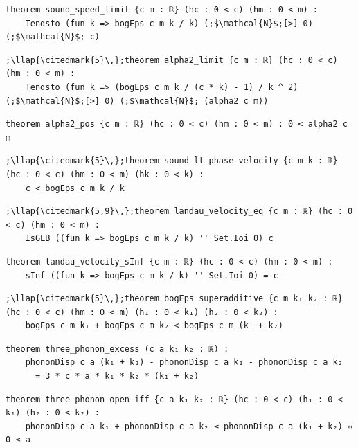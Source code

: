 \begin{lstlisting}[style=leancat]
theorem sound_speed_limit {c m : ℝ} (hc : 0 < c) (hm : 0 < m) :
    Tendsto (fun k => bogEps c m k / k) (;$\mathcal{N}$;[>] 0) (;$\mathcal{N}$; c)
\end{lstlisting}

\begin{lstlisting}[style=leancat]
;\llap{\citedmark{5}\,};theorem alpha2_limit {c m : ℝ} (hc : 0 < c) (hm : 0 < m) :
    Tendsto (fun k => (bogEps c m k / (c * k) - 1) / k ^ 2) (;$\mathcal{N}$;[>] 0) (;$\mathcal{N}$; (alpha2 c m))
\end{lstlisting}

\begin{lstlisting}[style=leancat]
theorem alpha2_pos {c m : ℝ} (hc : 0 < c) (hm : 0 < m) : 0 < alpha2 c m
\end{lstlisting}

\begin{lstlisting}[style=leancat]
;\llap{\citedmark{5}\,};theorem sound_lt_phase_velocity {c m k : ℝ} (hc : 0 < c) (hm : 0 < m) (hk : 0 < k) :
    c < bogEps c m k / k
\end{lstlisting}

\begin{lstlisting}[style=leancat]
;\llap{\citedmark{5,9}\,};theorem landau_velocity_eq {c m : ℝ} (hc : 0 < c) (hm : 0 < m) :
    IsGLB ((fun k => bogEps c m k / k) '' Set.Ioi 0) c
\end{lstlisting}

\begin{lstlisting}[style=leancat]
theorem landau_velocity_sInf {c m : ℝ} (hc : 0 < c) (hm : 0 < m) :
    sInf ((fun k => bogEps c m k / k) '' Set.Ioi 0) = c
\end{lstlisting}

\begin{lstlisting}[style=leancat]
;\llap{\citedmark{5}\,};theorem bogEps_superadditive {c m k₁ k₂ : ℝ} (hc : 0 < c) (hm : 0 < m) (h₁ : 0 < k₁) (h₂ : 0 < k₂) :
    bogEps c m k₁ + bogEps c m k₂ < bogEps c m (k₁ + k₂)
\end{lstlisting}

\begin{lstlisting}[style=leancat]
theorem three_phonon_excess (c a k₁ k₂ : ℝ) :
    phononDisp c a (k₁ + k₂) - phononDisp c a k₁ - phononDisp c a k₂
      = 3 * c * a * k₁ * k₂ * (k₁ + k₂)
\end{lstlisting}

\begin{lstlisting}[style=leancat]
theorem three_phonon_open_iff {c a k₁ k₂ : ℝ} (hc : 0 < c) (h₁ : 0 < k₁) (h₂ : 0 < k₂) :
    phononDisp c a k₁ + phononDisp c a k₂ ≤ phononDisp c a (k₁ + k₂) ↔ 0 ≤ a
\end{lstlisting}

